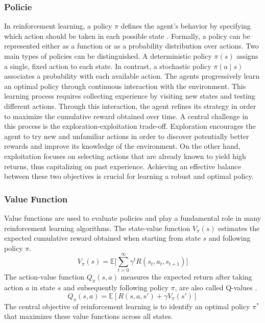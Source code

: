 \documentclass[12pt,a4paper]{report}
\begin{document}
\subsubsection{Policie}
In reinforcement learning, a policy $\pi$ defines the agent's behavior by specifying which action should be taken in each possible state \cite{chiave45}. Formally, a policy can be represented either as a function or as a probability distribution over actions. 
Two main types of policies can be distinguished. A deterministic policy $\pi(s)$ assigns a single, fixed action to each state. In contrast, a stochastic policy $\pi(a \mid s)$ associates a probability with each available action.
The agents progressively learn an optimal policy through continuous interaction with the environment. This learning process requires collecting experience by visiting new states and testing different actions. Through this interaction, the agent refines its strategy 
in order to maximize the cumulative reward obtained over time.
A central challenge in this process is the exploration-exploitation trade-off. Exploration encourages the agent to try new and unfamiliar actions in order to discover potentially better rewards and improve its knowledge of the environment. On the other hand, exploitation focuses 
on selecting actions that are already known to yield high returns, thus capitalizing on past experience. Achieving an effective balance between these two objectives is crucial for learning a robust and optimal policy.
\subsubsection{Value Function}
Value functions are used to evaluate policies and play a fundamental role in many reinforcement learning algorithms. The state-value 
function $V_\pi(s)$ estimates the expected cumulative reward obtained when starting from state $s$ and following policy $\pi$.
\[
V_\pi(s) = \mathbb{E}\Bigg[ \sum_{t=0}^{\infty} \gamma^t R(s_t, a_t, s_{t+1}) \Bigg]
\]
The action-value function $Q_\pi(s, a)$ measures the expected return after taking action $a$ in state $s$ and subsequently following policy $\pi$, are also called Q-values \cite{chiave6}. 
\[
Q_\pi(s, a) = \mathbb{E}\left[R(s, a, s') + \gamma V_\pi(s')\right]
\]
The central objective of reinforcement learning is to identify an optimal policy $\pi^*$ that maximizes these value functions across all states.
\end{document}
